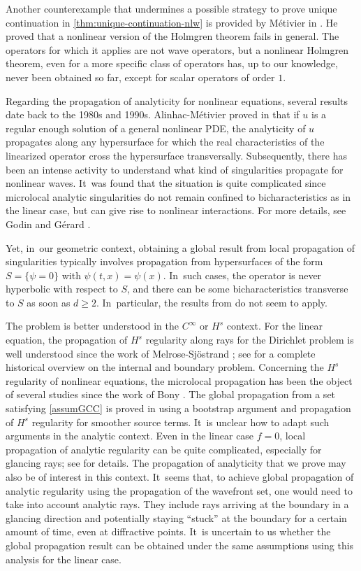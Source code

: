 \documentclass[JEP,XML,SOM,Unicode,published]{cedram}
\theoremstyle{definition}
\begin{document}
Another counterexample that undermines a possible strategy to prove unique continuation in \cref{thm:unique-continuation-nlw} is provided by Métivier in \cite{M:93}. He proved that a nonlinear version of the Holmgren theorem fails in general. The operators for which it applies are not wave operators, but a nonlinear Holmgren theorem, even for a more specific class of operators has, up to our knowledge, never been obtained so far, except for scalar operators of order $1$.

Regarding the propagation of analyticity for nonlinear equations, several results date back to the 1980s and 1990s. Alinhac-Métivier proved in \cite{AM:84,AM:84b} that if $u$ is a regular enough solution of a general nonlinear PDE, the analyticity of $u$ propagates along any hypersurface for which the real characteristics of the linearized operator cross the hypersurface transversally. Subsequently, there has been an intense activity to understand what kind of singularities propagate for nonlinear waves. It~was found that the situation is quite complicated since microlocal analytic singularities do not remain confined to bicharacteristics as in the linear case, but can give rise to nonlinear interactions. For more details, see Godin \cite{G:86} and Gérard \cite{G:88}.

Yet, in~our geometric context, obtaining a global result from local propagation of singularities typically involves propagation from hypersurfaces of the form $S=\{\psi=0\}$ with $\psi(t,x)=\psi(x)$. In~such cases, the operator is never hyperbolic with respect to $S$, and there can be some bicharacteristics transverse to $S$ as soon as $d\geq 2$. In~particular, the results from \cite{AM:84,AM:84b} do not seem to apply.

The problem is better understood in the $C^{\infty}$ or $H^s$ context. For the linear equation, the propagation of $H^s$ regularity along rays for the Dirichlet problem is well understood since the work of Melrose-Sjöstrand \cite{MS:78}; see \cite{H:07} for a complete historical overview on the internal and boundary problem. Concerning the $H^s$ regularity of nonlinear equations, the microlocal propagation has been the object of several studies since the work of Bony \cite{B:81}. The global propagation from a set satisfying \ref{assumGCC} is proved in \cite{DLZ03} using a bootstrap argument and propagation of $H^s$ regularity for smoother source terms. It~is unclear how to adapt such arguments in the analytic context. Even in the linear case $f=0$, local propagation of analytic regularity can be quite complicated, especially for glancing rays; see \cite{RS:81} for details. The propagation of analyticity that we prove may also be of interest in this context. It~seems that, to achieve global propagation of analytic regularity using the propagation of the wavefront set, one would need to take into account analytic rays. They include rays arriving at the boundary in a glancing direction and potentially staying ``stuck'' at the boundary for a certain amount of time, even at diffractive points. It~is uncertain to us whether the global propagation result can be obtained under the same assumptions using this analysis for the linear case.
\end{document}
